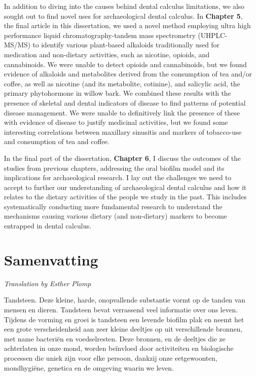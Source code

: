 \documentclass[
  b5paper,
]{book}
\begin{document}
In addition to diving into the causes behind dental calculus
limitations, we also sought out to find novel uses for archaeological
dental calculus. In \textbf{Chapter 5}, the final article in this
dissertation, we used a novel method employing ultra high performance
liquid chromatography-tandem mass spectrometry (UHPLC-MS/MS) to identify
various plant-based alkaloids traditionally used for medication and
non-dietary activities, such as nicotine, opioids, and cannabinoids. We
were unable to detect opioids and cannabinoids, but we found evidence of
alkaloids and metabolites derived from the consumption of tea and/or
coffee, as well as nicotine (and its metabolite, cotinine), and
salicylic acid, the primary phytohormone in willow bark. We combined
these results with the presence of skeletal and dental indicators of
disease to find patterns of potential disease management. We were unable
to definitively link the presence of these with evidence of disease to
justify medicinal activities, but we found some interesting correlations
between maxillary sinusitis and markers of tobacco-use and consumption
of tea and coffee.

In the final part of the dissertation, \textbf{Chapter 6}, I discuss the
outcomes of the studies from previous chapters, addressing the oral
biofilm model and its implications for archaeological research. I lay
out the challenges we need to accept to further our understanding of
archaeological dental calculus and how it relates to the dietary
activities of the people we study in the past. This includes
systematically conducting more fundamental research to understand the
mechanisms causing various dietary (and non-dietary) markers to become
entrapped in dental calculus.

\label{samenvatting}

\chapter*{Samenvatting}


\emph{Translation by Esther Plomp}

Tandsteen. Deze kleine, harde, onopvallende substantie vormt op de
tanden van mensen en dieren. Tandsteen bevat verrassend veel informatie
over ons leven. Tijdens de vorming en groei is tandsteen een levende
biofilm plak en neemt het een grote verscheidenheid aan zeer kleine
deeltjes op uit verschillende bronnen, met name bacteriën en
voedselresten. Deze bronnen, en de deeltjes die ze achterlaten in onze
mond, worden beïnvloed door activiteiten en biologische processen die
uniek zijn voor elke persoon, dankzij onze eetgewoonten, mondhygiëne,
genetica en de omgeving waarin we leven.
\end{document}
